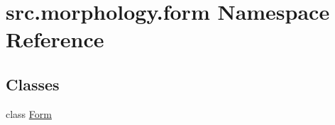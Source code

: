 \hypertarget{namespacesrc_1_1morphology_1_1form}{\section{src.\+morphology.\+form Namespace Reference}
\label{namespacesrc_1_1morphology_1_1form}
}
\subsection*{Classes}
\begin{DoxyCompactItemize}
\item 
class \hyperlink{classsrc_1_1morphology_1_1form_1_1_form}{Form}
\end{DoxyCompactItemize}
